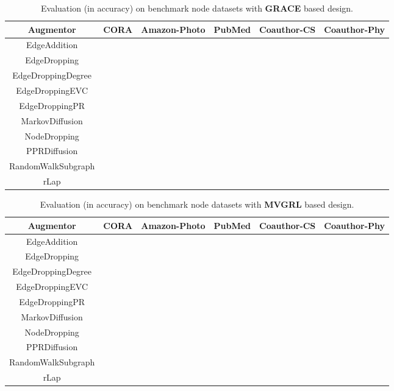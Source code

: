 \documentclass{article}
\theoremstyle{plain}
\theoremstyle{definition}
\theoremstyle{remark}
\begin{document}
\begin{table*}[ht!]
\centering
\caption{Evaluation (in accuracy) on benchmark node datasets with \textbf{GRACE} based design.}
\label{table:results_grace}
\vskip 0.15in
\begin{center}
\begin{small}
\begin{sc}
\begin{tabular}{c|c|c|c|c|c}
\toprule
Augmentor & CORA & Amazon-Photo & PubMed & Coauthor-CS & Coauthor-Phy \\
\midrule
EdgeAddition &  &   &  &  &  \\
EdgeDropping &  &  &   &  &  \\
EdgeDroppingDegree & \underline{}  &  &  &  &  \\
EdgeDroppingEVC &  &  &   &  & \\
EdgeDroppingPR &  &   &  &  &   \\
MarkovDiffusion &   &    &  &  &  \\
NodeDropping &   & \underline{} &  & \underline{} & \underline{}  \\
PPRDiffusion &   &  &  &  &  \\
RandomWalkSubgraph &  &  & \underline{}  &  & \\
rLap &   &  &  &   &  \\
\bottomrule
\end{tabular}
\end{sc}
\end{small}
\end{center}
\vskip -0.1in
\end{table*}

\begin{table*}[ht!]
\centering
\caption{Evaluation (in accuracy) on benchmark node datasets with \textbf{MVGRL} based design.}
\label{table:results_mvgrl}
\vskip 0.15in
\begin{center}
\begin{small}
\begin{sc}
\begin{tabular}{c|c|c|c|c|c}
\toprule
Augmentor & CORA & Amazon-Photo & PubMed & Coauthor-CS & Coauthor-Phy \\
\midrule
EdgeAddition &   &  &   &  &  \\
EdgeDropping &   &  &   &    & \underline{}\\
EdgeDroppingDegree &   &  &  &  & \\
EdgeDroppingEVC &   &  & \underline{} & \underline{} &  \\
EdgeDroppingPR &  &   &  &  & \\
MarkovDiffusion &   & \underline{} &  &  &  \\
NodeDropping & \underline{} &  &  &  &   \\
PPRDiffusion &   &   &  &  &  \\
RandomWalkSubgraph &   &  &  &  & \\
rLap &  &  &   &  &  \\
\bottomrule
\end{tabular}
\end{sc}
\end{small}
\end{center}
\vskip -0.1in
\end{table*}
\end{document}
